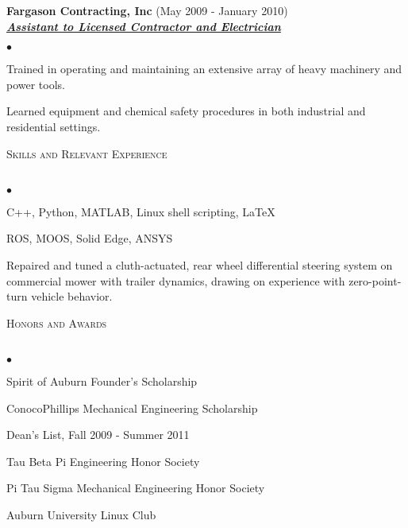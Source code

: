 \documentclass{article}
\newcommand{\lineunder} {
	\vspace*{-8pt} \\
	\hspace*{-18pt} \hrulefill \\
}
\newcommand{\header} [1] {
	{\hspace*{-15pt}\vspace*{6pt} \textsc{#1}} 
	\vspace*{-6pt} \lineunder
}
\newcommand{\employer} [3] {
	{ \textbf{#1} (#2)\\ \underline{\textbf{\emph{#3}}}\\  }
}
\newenvironment{achievements}{
	\begin{list}
		{$\bullet$}{\topsep 0pt \itemsep -2pt}}{\vspace*{4pt}
	\end{list}
}
\begin{document}
\employer{Fargason Contracting, Inc}{May 2009 - January 2010}{Assistant to Licensed Contractor and Electrician}
	\begin{achievements}
	\item Trained in operating and maintaining an extensive array of heavy machinery and power tools.
	\item Learned equipment and chemical safety procedures in both industrial and residential settings.
	\end{achievements}


\header{Skills and Relevant Experience}
\begin{achievements}
\item C++, Python, MATLAB, Linux shell scripting, \LaTeX
\item ROS, MOOS,  Solid Edge, ANSYS
\item Repaired and tuned a cluth-actuated, rear wheel differential steering system on commercial mower with trailer dynamics, drawing on experience with zero-point-turn vehicle behavior.
\end{achievements}


\header{Honors and Awards}
\begin{achievements}
\item  Spirit of Auburn Founder's Scholarship
\item ConocoPhillips Mechanical Engineering Scholarship
\item Dean's List, Fall 2009 - Summer 2011
\item Tau Beta Pi Engineering Honor Society
\item Pi Tau Sigma Mechanical Engineering Honor Society
\item Auburn University Linux Club
\end{achievements}
\end{document}
